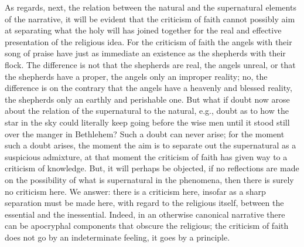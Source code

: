\documentclass[12pt]{book}
\newcommand{\opage}[1]{\marginnote{\footnotesize\textit{[#1]}}}
\begin{document}
\opage{60}\setcounter{footnote}{0}%
As regards, next, the relation between the natural and the supernatural elements of the narrative, it will be evident that the criticism of faith cannot possibly aim at separating what the holy will has joined together for the real and effective presentation of the religious idea. For the criticism of faith the angels with their song of praise have just as immediate an existence as the shepherds with their flock. The difference is not that the shepherds are real, the angels unreal, or that the shepherds have a proper, the angels only an improper reality; no, the difference is on the contrary that the angels have a heavenly and blessed reality, the shepherds only an earthly and perishable one. But what if doubt now arose about the relation of the supernatural to the natural, e.g., doubt as to how the star in the sky could literally keep going before the wise men until it stood still over the manger in Bethlehem? Such a doubt can never arise; for the moment such a doubt arises, the moment the aim is to separate out the supernatural as a suspicious admixture, at that moment the criticism of faith has given way to a criticism of knowledge. But, it will perhaps be objected, if no reflections are made on the possibility of what is supernatural in the phenomena, then there is surely no criticism here. We answer: there is a criticism here, insofar as a sharp separation must be made here, with regard to the religious itself, between the essential and the inessential. Indeed, in an otherwise canonical narrative there can be apocryphal components that obscure the religious; the criticism of faith does not go by an indeterminate feeling, it goes by a principle.
\end{document}

